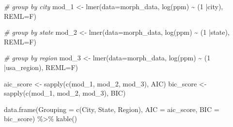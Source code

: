 \documentclass[
  11pt,
]{article}
\newenvironment{Shaded}{\begin{snugshade}}{\end{snugshade}}
\newcommand{\AttributeTok}[1]{\textcolor[rgb]{0.77,0.63,0.00}{#1}}
\newcommand{\CommentTok}[1]{\textcolor[rgb]{0.56,0.35,0.01}{\textit{#1}}}
\newcommand{\DecValTok}[1]{\textcolor[rgb]{0.00,0.00,0.81}{#1}}
\newcommand{\FunctionTok}[1]{\textcolor[rgb]{0.00,0.00,0.00}{#1}}
\newcommand{\NormalTok}[1]{#1}
\newcommand{\OtherTok}[1]{\textcolor[rgb]{0.56,0.35,0.01}{#1}}
\newcommand{\SpecialCharTok}[1]{\textcolor[rgb]{0.00,0.00,0.00}{#1}}
\newcommand{\StringTok}[1]{\textcolor[rgb]{0.31,0.60,0.02}{#1}}
\begin{document}
\begin{Shaded}
\begin{Highlighting}[]
\CommentTok{\# group by city}
\NormalTok{mod\_1 }\OtherTok{\textless{}{-}} \FunctionTok{lmer}\NormalTok{(}\AttributeTok{data=}\NormalTok{morph\_data, }\FunctionTok{log}\NormalTok{(ppm) }\SpecialCharTok{\textasciitilde{}}\NormalTok{ (}\DecValTok{1} \SpecialCharTok{|}\NormalTok{city), }\AttributeTok{REML=}\NormalTok{F)}

\CommentTok{\# group by state}
\NormalTok{mod\_2 }\OtherTok{\textless{}{-}} \FunctionTok{lmer}\NormalTok{(}\AttributeTok{data=}\NormalTok{morph\_data, }\FunctionTok{log}\NormalTok{(ppm) }\SpecialCharTok{\textasciitilde{}}\NormalTok{ (}\DecValTok{1} \SpecialCharTok{|}\NormalTok{state), }\AttributeTok{REML=}\NormalTok{F)}

\CommentTok{\# group by region}
\NormalTok{mod\_3 }\OtherTok{\textless{}{-}} \FunctionTok{lmer}\NormalTok{(}\AttributeTok{data=}\NormalTok{morph\_data, }\FunctionTok{log}\NormalTok{(ppm) }\SpecialCharTok{\textasciitilde{}}\NormalTok{ (}\DecValTok{1} \SpecialCharTok{|}\NormalTok{usa\_region), }\AttributeTok{REML=}\NormalTok{F)}

\NormalTok{aic\_score }\OtherTok{\textless{}{-}} \FunctionTok{sapply}\NormalTok{(}\FunctionTok{c}\NormalTok{(mod\_1, mod\_2, mod\_3), AIC)}
\NormalTok{bic\_score }\OtherTok{\textless{}{-}} \FunctionTok{sapply}\NormalTok{(}\FunctionTok{c}\NormalTok{(mod\_1, mod\_2, mod\_3), BIC)}

\FunctionTok{data.frame}\NormalTok{(}\StringTok{\textquotesingle{}Grouping\textquotesingle{}} \OtherTok{=} \FunctionTok{c}\NormalTok{(}\StringTok{\textquotesingle{}City\textquotesingle{}}\NormalTok{, }\StringTok{\textquotesingle{}State\textquotesingle{}}\NormalTok{, }\StringTok{\textquotesingle{}Region\textquotesingle{}}\NormalTok{), }\StringTok{\textquotesingle{}AIC\textquotesingle{}} \OtherTok{=}\NormalTok{ aic\_score, }\StringTok{\textquotesingle{}BIC\textquotesingle{}} \OtherTok{=}\NormalTok{ bic\_score) }\SpecialCharTok{\%\textgreater{}\%}
  \FunctionTok{kable}\NormalTok{()}
\end{Highlighting}
\end{Shaded}
\end{document}
